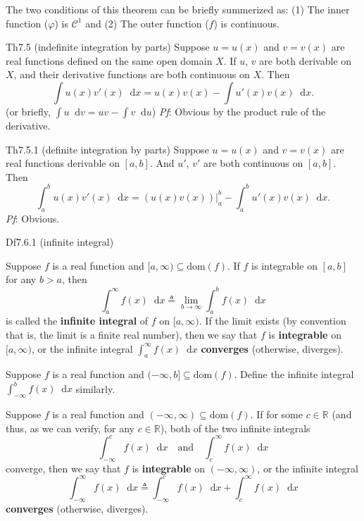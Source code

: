 \documentclass{article}
\newcommand{\dif}{\mathop{}\!\mathrm{d}}
\begin{document}
\begin{Rmk}{}
    The two conditions of this theorem can be briefly summerized as: (1) The inner function ($\varphi$) is $\mathcal{C}^1$ and (2) The outer function ($f$) is continuous.
\end{Rmk}

\begin{Th}{Th7.5 (indefinite integration by parts)}
    Suppose $u = u(x)$ and $v = v(x)$ are real functions defined on the same open domain $X$. If $u$, $v$ are both derivable on $X$, and their derivative functions are both continuous on $X$. Then
    $$\int u(x)v'(x)\dif x = u(x)v(x) - \int u'(x)v(x)\dif x.$$
    (or briefly, $\int u\dif v = uv - \int v\dif u$)
    \tcblower
    \textit{Pf}: Obvious by the product rule of the derivative.
\end{Th}

\begin{Th}{Th7.5.1 (definite integration by parts)}
    Suppose $u = u(x)$ and $v = v(x)$ are real functions derivable on $[a, b]$. And $u'$, $v'$ are both continuous on $[a, b]$. Then
    $$\int_a^b u(x)v'(x)\dif x = \left(u(x)v(x)\right)\Big|_a^b - \int_a^b u'(x)v(x)\dif x.$$
    \tcblower
    \textit{Pf}: Obvious.
\end{Th}

\begin{Df}{Df7.6.1 (infinite integral)}
    \begin{compactenum}
        \item Suppose $f$ is a real function and $[a, \infty)\subseteq\text{dom}(f)$. If $f$ is integrable on $[a, b]$ for any $b>a$, then 
        $$\int_a^\infty f(x)\dif x \triangleq \lim_{b\to\infty}\int_a^b f(x)\dif x$$
        is called the \textbf{infinite integral} of $f$ on $[a, \infty)$. If the limit exists (by convention that is, the limit is a finite real number), then we say that $f$ is \textbf{integrable} on $[a, \infty)$, or the infinite integral $\int_a^\infty f(x)\dif x$ \textbf{converges} (otherwise, diverges).
        \item Suppose $f$ is a real function and $(-\infty, b]\subseteq\text{dom}(f)$. Define the infinite integral $\int_{-\infty}^b f(x)\dif x$ similarly.
        \item Suppose $f$ is a real function and $(-\infty, \infty)\subseteq\text{dom}(f)$. If for some $c\in\mathbb{R}$ (\textcolor{Th}{and thus, as we can verify, for any $c\in\mathbb{R}$}), both of the two infinite integrals
        $$ \int_{-\infty}^c f(x)\dif x \quad \text{and} \quad \int_c^\infty f(x)\dif x $$
        converge, then we say that $f$ is \textbf{integrable} on $(-\infty, \infty)$, or the infinite integral 
        $$\int_{-\infty}^\infty f(x)\dif x \triangleq \int_{-\infty}^c f(x)\dif x + \int_c^\infty f(x)\dif x$$
        \textbf{converges} (otherwise, diverges).
    \end{compactenum}
\end{Df}
\end{document}
